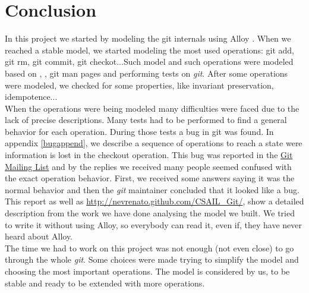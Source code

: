 \section{Conclusion}
In this project we started by modeling the git internals using Alloy
\cite{Jackson:2006:SAL:1146359}. When we reached
a stable model, we started modeling the most used operations: git
add, git rm, git commit, git checkot...Such model and such
operations were modeled based on \cite{gitComm}, \cite{progit}, git man
pages and performing tests on \emph{git}. After some operations were
modeled, we checked for some properties, like invariant
preservation, idempotence...\\

When the operations were being modeled many
difficulties were faced due to the lack of precise descriptions. 
Many tests had to be performed to find a general behavior for each
operation. During those tests a bug in git was found. In appendix
\ref{bugappend}, we describe a
sequence of operations to reach a state were information is lost in the
checkout operation. This
bug was reported in the \href{mailto:git@vger.kernel.org}{Git Mailing
List} and by the replies we received many people seemed confused with the
exact operation behavior. First, we received some answers saying it
was the normal behavior and then the \emph{git} maintainer concluded that
it looked like a bug.\\

This report as well as
\href{http://nevrenato.github.com/CSAIL_Git/}{http://nevrenato.github.com/CSAIL\_Git/},
show a detailed description from the work we have done analysing the
model we built. We tried to write it without using Alloy, so
everybody can read it, even if, they have never heard about Alloy.\\

The time we had to work on this project was not enough (not even close) to
go through the whole \emph{git}. Some choices were made trying to
simplify the model and choosing the most important operations. The
model is considered by us, to be stable and ready to be extended with
more operations.\\

